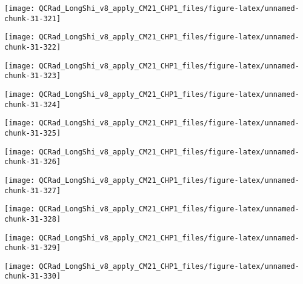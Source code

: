 \documentclass[
  10pt,
  a4paper,oneside]{article}
\begin{document}
\begin{center}\texttt{[image: QCRad\_LongShi\_v8\_apply\_CM21\_CHP1\_files/figure-latex/unnamed-chunk-31-321]} \end{center}

\begin{center}\texttt{[image: QCRad\_LongShi\_v8\_apply\_CM21\_CHP1\_files/figure-latex/unnamed-chunk-31-322]} \end{center}

\begin{center}\texttt{[image: QCRad\_LongShi\_v8\_apply\_CM21\_CHP1\_files/figure-latex/unnamed-chunk-31-323]} \end{center}

\begin{center}\texttt{[image: QCRad\_LongShi\_v8\_apply\_CM21\_CHP1\_files/figure-latex/unnamed-chunk-31-324]} \end{center}

\begin{center}\texttt{[image: QCRad\_LongShi\_v8\_apply\_CM21\_CHP1\_files/figure-latex/unnamed-chunk-31-325]} \end{center}

\begin{center}\texttt{[image: QCRad\_LongShi\_v8\_apply\_CM21\_CHP1\_files/figure-latex/unnamed-chunk-31-326]} \end{center}

\begin{center}\texttt{[image: QCRad\_LongShi\_v8\_apply\_CM21\_CHP1\_files/figure-latex/unnamed-chunk-31-327]} \end{center}

\begin{center}\texttt{[image: QCRad\_LongShi\_v8\_apply\_CM21\_CHP1\_files/figure-latex/unnamed-chunk-31-328]} \end{center}

\begin{center}\texttt{[image: QCRad\_LongShi\_v8\_apply\_CM21\_CHP1\_files/figure-latex/unnamed-chunk-31-329]} \end{center}

\begin{center}\texttt{[image: QCRad\_LongShi\_v8\_apply\_CM21\_CHP1\_files/figure-latex/unnamed-chunk-31-330]} \end{center}
\end{document}

